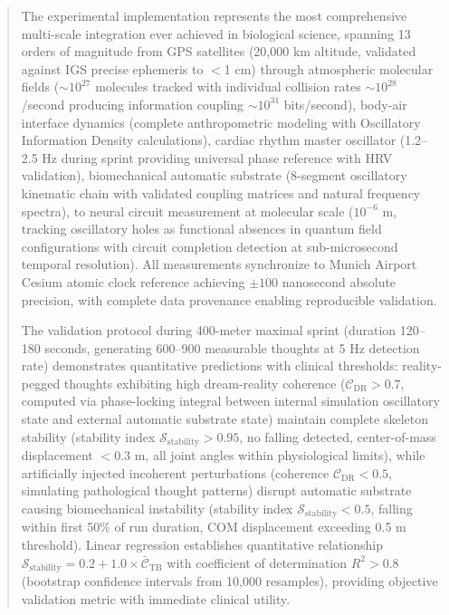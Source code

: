 \documentclass[11pt,onecolumn]{article}
\begin{document}
\begin{abstract}
The experimental implementation represents the most comprehensive multi-scale integration ever achieved in biological science, spanning 13 orders of magnitude from GPS satellites (20,000 km altitude, validated against IGS precise ephemeris to $<$1 cm) through atmospheric  molecular fields ($\sim 10^{27}$ molecules tracked with individual collision rates $\sim 10^{28}$ /second producing information coupling $\sim 10^{31}$ bits/second), body-air interface dynamics (complete anthropometric modeling with Oscillatory Information Density calculations), cardiac rhythm master oscillator (1.2--2.5 Hz during sprint providing universal phase reference with HRV validation), biomechanical automatic substrate (8-segment oscillatory kinematic chain with validated coupling matrices and natural frequency spectra), to neural circuit measurement at molecular scale ($10^{-6}$ m, tracking oscillatory holes as functional absences in  quantum field configurations with circuit completion detection at sub-microsecond temporal resolution). All measurements synchronize to Munich Airport Cesium atomic clock reference achieving $\pm 100$ nanosecond absolute precision, with complete data provenance enabling reproducible validation.

The validation protocol during 400-meter maximal sprint (duration 120--180 seconds, generating 600--900 measurable thoughts at 5 Hz detection rate) demonstrates quantitative predictions with clinical thresholds: reality-pegged thoughts exhibiting high dream-reality coherence ($\mathcal{C}_{\text{DR}} > 0.7$, computed via phase-locking integral between internal simulation oscillatory state and external automatic substrate state) maintain complete skeleton stability (stability index $\mathcal{S}_{\text{stability}} > 0.95$, no falling detected, center-of-mass displacement $< 0.3$ m, all joint angles within physiological limits), while artificially injected incoherent perturbations (coherence $\mathcal{C}_{\text{DR}} < 0.5$, simulating pathological thought patterns) disrupt automatic substrate causing biomechanical instability (stability index $\mathcal{S}_{\text{stability}} < 0.5$, falling within first 50\% of run duration, COM displacement exceeding 0.5 m threshold). Linear regression establishes quantitative relationship $\mathcal{S}_{\text{stability}} = 0.2 + 1.0 \times \bar{\mathcal{C}}_{\text{TB}}$ with coefficient of determination $R^2 > 0.8$ (bootstrap confidence intervals from 10,000 resamples), providing objective validation metric with immediate clinical utility.


\end{abstract}
\end{document}
